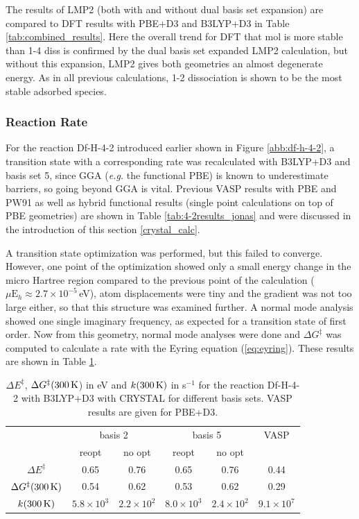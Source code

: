 \documentclass[11pt,DIV=13,BCOR=5mm,a4paper,headinclude]{scrbook}
\newcommand\todo[1]{\textcolor{red}{TODO: \textit{{#1}}}}
\begin{document}
The results of LMP2 (both with and without dual basis set expansion) are compared to DFT results with PBE+D3 and B3LYP+D3 in Table \ref{tab:combined_results}.
Here the overall trend for DFT that mol is more stable than 1-4 diss is confirmed by the dual basis set expanded LMP2 calculation, but without this expansion, LMP2 gives both geometries an almost degenerate energy.
As in all previous calculations, 1-2 dissociation is shown to be the most stable  adsorbed species.
 

\subsubsection{Reaction Rate}
For the reaction Df-H-4-2 introduced earlier shown in Figure \ref{abb:df-h-4-2}, a transition state with a corresponding rate was recalculated with B3LYP+D3 and basis set 5, since GGA (\textit{e.g.} the functional PBE) is known to underestimate barriers\cite{Zhao05}, so going beyond GGA is vital.
Previous VASP results with PBE and PW91 as well as hybrid functional results (single point calculations on top of PBE geometries) are shown in Table \ref{tab:4-2results_jonas} and were discussed in the introduction of this section \ref{crystal_calc}.


A transition state optimization was performed, but this failed to converge.
However, one point of the optimization showed only a small energy change in the micro Hartree region compared to the previous point of the calculation ($\mu\textrm{E}_h \approx 2.7\times 10^{-5}\,$eV), atom displacements were tiny and the gradient was not too large either, so that this structure was examined further.
A normal mode analysis showed one single imaginary frequency, as expected for a transition state of first order.
Now from this geometry, normal mode analyses were done and $\Delta G^\ddagger$ was computed to calculate a rate with the Eyring equation (\ref{eq:eyring}).
These results are shown in Table \ref{tab:k_crystal-reopt+noopt}.
\begin{table}[!h]
  \centering
  \caption{$\Delta E^\ddagger$, $\Delta G^\ddagger(\textrm{300\,K}$) in eV and $k(\textrm{300\,K})$ in s$^{-1}$ for the reaction Df-H-4-2 with B3LYP+D3 with CRYSTAL for different basis sets. VASP results are given for PBE+D3.}
  \begin{tabular}{c|cc|cc|c}%
  \toprule
   & \multicolumn{2}{c}{basis 2} &\multicolumn{2}{c}{basis 5}  &VASP\\ %
   & reopt & no opt & reopt & no opt & \\\midrule %
   $\Delta E^\ddagger$ &0.65 &0.76 &0.65 & 0.76 &0.44\\%
   $\Delta G^\ddagger(\textrm{300\,K})$ &0.54 &0.62 &0.53 &0.62 &0.29\\%
   $k(\textrm{300\,K})$ &$5.8\times 10^3$ &$2.2\times 10^2$ &$8.0\times 10^3$ &$2.4\times 10^2$ &$9.1\times 10^7$\\\bottomrule%
  \end{tabular}
  \label{tab:k_crystal-reopt+noopt}
\end{table}
\\
\end{document}
